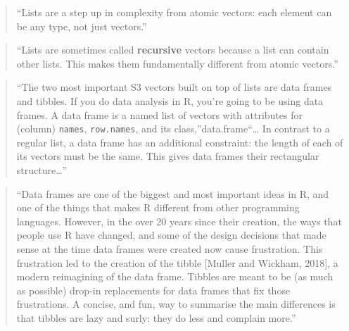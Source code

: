 \documentclass[]{tufte-book}
\begin{document}
\begin{quote}
``Lists are a step up in complexity from atomic vectors: each element can be
any type, not just vectors.'' \citep{wickham2019advanced}
\end{quote}

\begin{quote}
``Lists are sometimes called \textbf{recursive} vectors because a list can contain
other lists. This makes them fundamentally different from atomic vectors.''
\citep{wickham2019advanced}
\end{quote}

\begin{quote}
``The two most important S3 vectors built on top of lists are data frames and
tibbles. If you do data analysis in R, you're going to be using data frames.
A data frame is a named list of vectors with attributes for (column) \texttt{names},
\texttt{row.names}, and its class,''data.frame``\ldots{} In contrast to a regular list, a
data frame has an additional constraint: the length of each of its vectors must
be the same. This gives data frames their rectangular structure\ldots{}'' \citep{wickham2019advanced}
\end{quote}

\begin{quote}
``Data frames are one of the biggest and most important ideas in R, and one of the
things that makes R different from other programming languages. However, in the
over 20 years since their creation, the ways that people use R have changed, and
some of the design decisions that made sense at the time data frames were created
now cause frustration. This frustration led to the creation of the tibble
{[}Muller and Wickham, 2018{]}, a modern reimagining of the data frame. Tibbles are
meant to be (as much as possible) drop-in replacements for data frames that fix
those frustrations. A concise, and fun, way to summarise the main differences is
that tibbles are lazy and surly: they do less and complain more.'' \citep{wickham2019advanced}
\end{quote}
\end{document}
